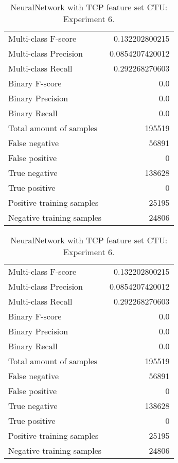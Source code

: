 \begin{table}[H]
\begin{minipage}{0.5\textwidth}
\caption{NeuralNetwork with TCP feature set CTU: \\Experiment 5.}
\centering
\begin{tabular}{l r}
\toprule
Multi-class F-score & 0.132202800215 \\
Multi-class Precision & 0.0854207420012 \\
Multi-class Recall & 0.292268270603 \\
\midrule
Binary F-score & 0.0 \\
Binary Precision & 0.0 \\
Binary Recall & 0.0 \\
\midrule
Total amount of samples & 195519 \\
False negative & 56891 \\
False positive & 0 \\
True negative & 138628 \\
True positive & 0 \\
\midrule
Positive training samples & 25195 \\
Negative training samples & 24806 \\
\bottomrule
\end{tabular}
\end{minipage}
\hfillx
\begin{minipage}{0.5\textwidth}
\caption{NeuralNetwork with TCP feature set CTU: \\Experiment 6.}
\centering
\begin{tabular}{l r}
\toprule
Multi-class F-score & 0.132202800215 \\
Multi-class Precision & 0.0854207420012 \\
Multi-class Recall & 0.292268270603 \\
\midrule
Binary F-score & 0.0 \\
Binary Precision & 0.0 \\
Binary Recall & 0.0 \\
\midrule
Total amount of samples & 195519 \\
False negative & 56891 \\
False positive & 0 \\
True negative & 138628 \\
True positive & 0 \\
\midrule
Positive training samples & 25195 \\
Negative training samples & 24806 \\
\bottomrule
\end{tabular}
\end{minipage}
\end{table}
